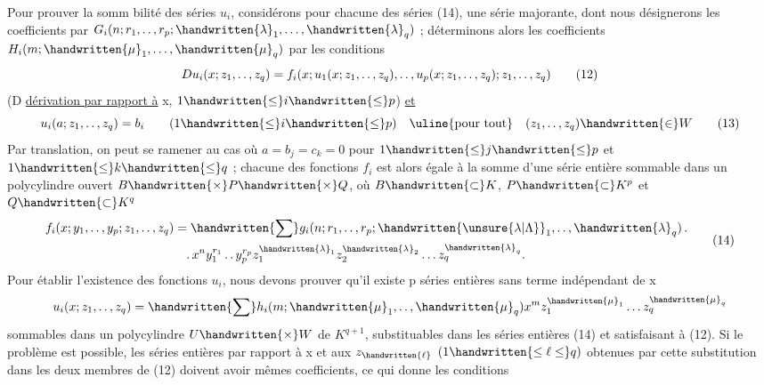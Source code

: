 Pour prouver la somm bilité des séries $u_i$, considérons pour chacune des séries (14), une série majorante, dont nous désignerons les coefficients par $G_i(n;r_1,\mathinner{\ldotp\ldotp},r_p;\handwritten{\lambda}_1,\ldots,\handwritten{\lambda}_q)$ ; déterminons alors les coefficients $H_i(m;\handwritten{\mu}_1,\ldots,\handwritten{\mu}_q)$ par les conditions
\[
Du_i(x;z_1,\mathinner{\ldotp\ldotp},z_q)=f_i(x;u_1(x;z_1,\mathinner{\ldotp\ldotp},z_q),\mathinner{\ldotp\ldotp},u_p(x;z_1,\mathinner{\ldotp\ldotp},z_q);z_1,\mathinner{\ldotp\ldotp},z_q)
\tag*{(12)}
\]
(D \uline{dérivation par rapport à} x, $1\handwritten{\leq}i\handwritten{\leq}p$) \uline{et}
\[
u_i(a;z_1,\mathinner{\ldotp\ldotp},z_q)=b_i\qquad(1\handwritten{\leq}i\handwritten{\leq}p)\quad\text{\uline{pour tout}}\quad(z_1,\mathinner{\ldotp\ldotp},z_q)\handwritten{\in}W
\tag*{(13)}
\]
Par translation, on peut se ramener au cas où $a=b_j=c_k=0$ pour $1\handwritten{\leq}j\handwritten{\leq}p$ et $1\handwritten{\leq}k\handwritten{\leq}q$ ; chacune des fonctions $f_i$ est alors égale à la somme d'une série entière sommable dans un polycylindre ouvert $B\handwritten{\times}P\handwritten{\times}Q$, où $B\handwritten{\subset}K$, $P\handwritten{\subset}K^p$ et $Q\handwritten{\subset}K^q$
\[
\begin{aligned}
f_i(x;y_1,\mathinner{\ldotp\ldotp},y_p;z_1,\mathinner{\ldotp\ldotp},z_q)&=\handwritten{\sum}g_i(n;r_1,\mathinner{\ldotp\ldotp},r_p;\handwritten{\unsure{\lambda|\Lambda}}_1,\mathinner{\ldotp\ldotp},\handwritten{\lambda}_q)\,\ldotp\\
&\quad\ldotp x^ny_1^{r_1}\mathinner{\ldotp\ldotp}y_p^{r_p}z_1^{\handwritten{\lambda}_1}z_2^{\handwritten{\lambda}_2}\ldots z_q^{\handwritten{\lambda}_q}.
\end{aligned}
\tag*{(14)}
\]
Pour établir l'existence des fonctions $u_i$, nous devons prouver qu'il existe p séries entières sans terme indépendant de x
\[
u_i(x;z_1,\mathinner{\ldotp\ldotp},z_q)=\handwritten{\sum}h_i(m;\handwritten{\mu}_1,\mathinner{\ldotp\ldotp},\handwritten{\mu}_q)x^mz_1^{\handwritten{\mu}_1}\ldots z_q^{\handwritten{\mu}_q}
\]
sommables dans un polycylindre $U\handwritten{\times}W$ de $K^{q+1}$, substituables dans les séries entières (14) et satisfaisant à (12). Si le problème est possible, les séries entières par rapport à x et aux $z_{\handwritten{\ell}}$ $(1\handwritten{\leq\ell\leq}q)$ obtenues par cette substitution dans les deux membres de (12) doivent avoir mêmes coefficients, ce qui donne les conditions
